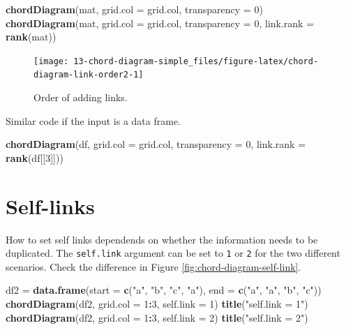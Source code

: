 \documentclass[]{book}
\newenvironment{Shaded}{\begin{snugshade}}{\end{snugshade}}
\newcommand{\KeywordTok}[1]{\textcolor[rgb]{0.13,0.29,0.53}{\textbf{#1}}}
\newcommand{\DataTypeTok}[1]{\textcolor[rgb]{0.13,0.29,0.53}{#1}}
\newcommand{\DecValTok}[1]{\textcolor[rgb]{0.00,0.00,0.81}{#1}}
\newcommand{\StringTok}[1]{\textcolor[rgb]{0.31,0.60,0.02}{#1}}
\newcommand{\OperatorTok}[1]{\textcolor[rgb]{0.81,0.36,0.00}{\textbf{#1}}}
\newcommand{\NormalTok}[1]{#1}
\theoremstyle{definition}
\theoremstyle{definition}
\theoremstyle{remark}
\begin{document}
\begin{Shaded}
\begin{Highlighting}[]
\KeywordTok{chordDiagram}\NormalTok{(mat, }\DataTypeTok{grid.col =}\NormalTok{ grid.col, }\DataTypeTok{transparency =} \DecValTok{0}\NormalTok{)}
\KeywordTok{chordDiagram}\NormalTok{(mat, }\DataTypeTok{grid.col =}\NormalTok{ grid.col, }\DataTypeTok{transparency =} \DecValTok{0}\NormalTok{, }\DataTypeTok{link.rank =} \KeywordTok{rank}\NormalTok{(mat))}
\end{Highlighting}
\end{Shaded}

\begin{figure}

{\centering \texttt{[image: 13-chord-diagram-simple\_files/figure-latex/chord-diagram-link-order2-1]} 

}

\caption{Order of adding links.}\label{fig:chord-diagram-link-order2}
\end{figure}

Similar code if the input is a data frame.

\begin{Shaded}
\begin{Highlighting}[]
\KeywordTok{chordDiagram}\NormalTok{(df, }\DataTypeTok{grid.col =}\NormalTok{ grid.col, }\DataTypeTok{transparency =} \DecValTok{0}\NormalTok{, }\DataTypeTok{link.rank =} \KeywordTok{rank}\NormalTok{(df[[}\DecValTok{3}\NormalTok{]]))}
\end{Highlighting}
\end{Shaded}

\section{Self-links}\label{self-links}

How to set self links dependends on whether the information needs to be
duplicated. The \texttt{self.link} argument can be set to \texttt{1} or
\texttt{2} for the two different scenarios. Check the difference in
Figure \ref{fig:chord-diagram-self-link}.

\begin{Shaded}
\begin{Highlighting}[]
\NormalTok{df2 =}\StringTok{ }\KeywordTok{data.frame}\NormalTok{(}\DataTypeTok{start =} \KeywordTok{c}\NormalTok{(}\StringTok{"a"}\NormalTok{, }\StringTok{"b"}\NormalTok{, }\StringTok{"c"}\NormalTok{, }\StringTok{"a"}\NormalTok{), }\DataTypeTok{end =} \KeywordTok{c}\NormalTok{(}\StringTok{"a"}\NormalTok{, }\StringTok{"a"}\NormalTok{, }\StringTok{"b"}\NormalTok{, }\StringTok{"c"}\NormalTok{))}
\KeywordTok{chordDiagram}\NormalTok{(df2, }\DataTypeTok{grid.col =} \DecValTok{1}\OperatorTok{:}\DecValTok{3}\NormalTok{, }\DataTypeTok{self.link =} \DecValTok{1}\NormalTok{)}
\KeywordTok{title}\NormalTok{(}\StringTok{"self.link = 1"}\NormalTok{)}
\KeywordTok{chordDiagram}\NormalTok{(df2, }\DataTypeTok{grid.col =} \DecValTok{1}\OperatorTok{:}\DecValTok{3}\NormalTok{, }\DataTypeTok{self.link =} \DecValTok{2}\NormalTok{)}
\KeywordTok{title}\NormalTok{(}\StringTok{"self.link = 2"}\NormalTok{)}
\end{Highlighting}
\end{Shaded}
\end{document}
